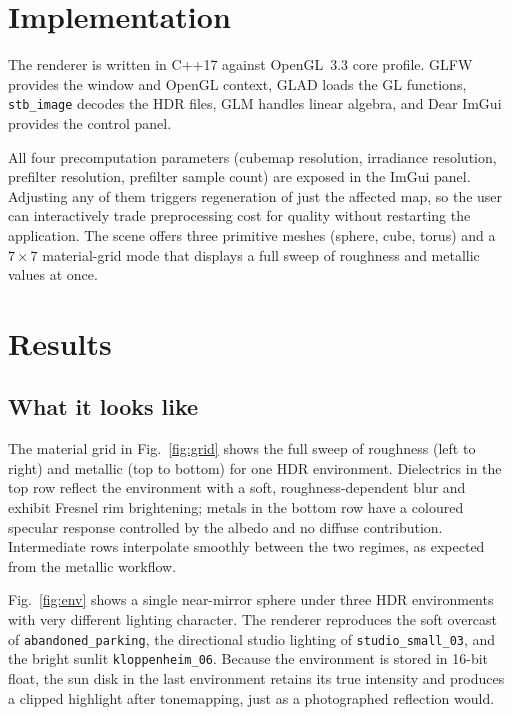 \documentclass{egpubl}
\begin{document}
\section{Implementation}\label{sec:impl}

The renderer is written in C++17 against OpenGL~3.3 core profile. GLFW
provides the window and OpenGL context, GLAD loads the GL functions,
\texttt{stb\_image} decodes the HDR files, GLM handles linear algebra, and
Dear ImGui provides the control panel.

All four precomputation parameters (cubemap resolution, irradiance
resolution, prefilter resolution, prefilter sample count) are exposed in
the ImGui panel. Adjusting any of them triggers regeneration of just the
affected map, so the user can interactively trade preprocessing cost for
quality without restarting the application. The scene offers three
primitive meshes (sphere, cube, torus) and a $7\!\times\!7$ material-grid
mode that displays a full sweep of roughness and metallic values at once.

\section{Results}\label{sec:results}

\subsection{What it looks like}

The material grid in Fig.~\ref{fig:grid} shows the full sweep of roughness
(left to right) and metallic (top to bottom) for one HDR environment.
Dielectrics in the top row reflect the environment with a soft,
roughness-dependent blur and exhibit Fresnel rim brightening; metals in
the bottom row have a coloured specular response controlled by the albedo
and no diffuse contribution. Intermediate rows interpolate smoothly
between the two regimes, as expected from the metallic workflow.

Fig.~\ref{fig:env} shows a single near-mirror sphere under three HDR
environments with very different lighting character. The renderer
reproduces the soft overcast of \texttt{abandoned\_parking}, the
directional studio lighting of \texttt{studio\_small\_03}, and the bright
sunlit \texttt{kloppenheim\_06}. Because the environment is stored in
16-bit float, the sun disk in the last environment retains its true
intensity and produces a clipped highlight after tonemapping, just as a
photographed reflection would.
\end{document}
